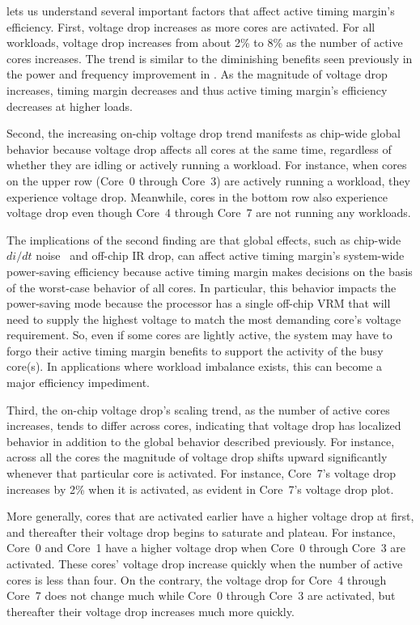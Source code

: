  lets us understand several important factors that affect active timing margin's efficiency. First, voltage drop increases as more cores are activated. For all workloads, voltage drop increases from about 2\% to 8\% as the number of active cores increases. The trend is similar to the diminishing benefits seen previously in the power and frequency improvement in . As the magnitude of voltage drop increases, timing margin decreases and thus active timing margin's efficiency decreases at higher loads. 

Second, the increasing on-chip voltage drop trend manifests as chip-wide global behavior because voltage drop affects all cores at the same time, regardless of whether they are idling or actively running a workload. For instance, when cores on the upper row (Core~0 through Core~3) are actively running a workload, they experience voltage drop. Meanwhile, cores in the bottom row also experience voltage drop even though Core~4 through Core~7 are not running any workloads. 

The implications of the second finding are that global effects, such as chip-wide $di/dt$ noise~\cite{gupta2007understanding,miller2012vrsync,bertran2014voltage} and off-chip IR drop, can affect active timing margin's system-wide power-saving efficiency because active timing margin makes decisions on the basis of the worst-case behavior of all cores. In particular, this behavior impacts the power-saving mode because the processor has a single off-chip VRM that will need to supply the highest voltage to match the most demanding core's voltage requirement. So, even if some cores are lightly active, the system may have to forgo their active timing margin benefits to support the activity of the busy core(s). In applications where workload imbalance exists, this can become a major efficiency impediment. 

Third, the on-chip voltage drop's scaling trend, as the number of active cores increases, tends to differ across cores, indicating that voltage drop has localized behavior in addition to the global behavior described previously. For instance, across all the cores the magnitude of voltage drop shifts upward significantly whenever that particular core is activated. For instance, Core~7's voltage drop increases by 2\% when it is activated, as evident in Core~7's voltage drop plot.

More generally, cores that are activated earlier have a higher voltage drop at first, and thereafter their voltage drop begins to saturate and plateau. For instance, Core~0 and Core~1 have a higher voltage drop when Core~0 through Core~3 are activated. These cores' voltage drop increase quickly when the number of active cores is less than four. On the contrary, the voltage drop for Core~4 through Core~7 does not change much while Core~0 through Core~3 are activated, but thereafter their voltage drop increases much more quickly.

